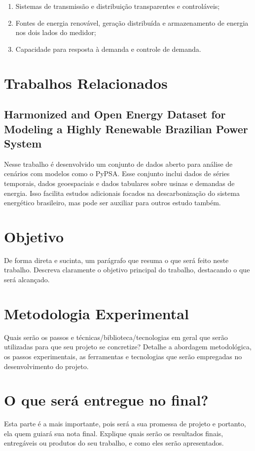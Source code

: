 \documentclass[a4paper,12pt]{article}
\begin{document}
\begin{enumerate}
    \item Sistemas de transmissão e distribuição transparentes e controláveis;
    \item Fontes de energia renovável, geração distribuída e armazenamento de energia nos dois lados do medidor;
    \item Capacidade para resposta à demanda e controle de demanda.
\end{enumerate}

\section{Trabalhos Relacionados}
\subsection{Harmonized and Open Energy Dataset for Modeling a Highly Renewable Brazilian Power System}

Nesse trabalho é desenvolvido um conjunto de dados aberto para análise de cenários com modelos como o PyPSA.
Esse conjunto inclui dados de séries temporais, dados geoespaciais e dados tabulares sobre usinas e demandas de energia.
Isso facilita estudos adicionais focados na descarbonização do sistema energético brasileiro, mas pode ser auxiliar para outros estudo também.

\section{Objetivo}
De forma direta e sucinta, um parágrafo que resuma o que será feito neste trabalho.
Descreva claramente o objetivo principal do trabalho, destacando o que será alcançado.

\section{Metodologia Experimental}
Quais serão os passos e técnicas/biblioteca/tecnologias em geral que serão utilizadas para que seu projeto se concretize?
Detalhe a abordagem metodológica, os passos experimentais, as ferramentas e tecnologias que serão empregadas no desenvolvimento do projeto.

\section{O que será entregue no final?}
Esta parte é a mais importante, pois será a sua promessa de projeto e portanto, ela quem guiará sua nota final.
Explique quais serão os resultados finais, entregáveis ou produtos do seu trabalho, e como eles serão apresentados.
\end{document}
